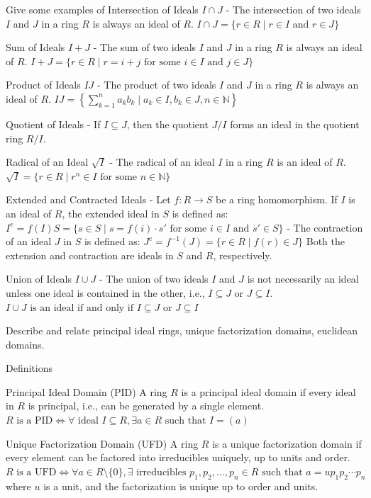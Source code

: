 Give some examples of 
Intersection of Ideals \(I \cap J\)
- The intersection of two ideals \(I\) and \(J\) in a ring \(R\) is always an ideal of \(R\).
\(
I \cap J = \{ r \in R \mid r \in I \text{ and } r \in J \}
\)

Sum of Ideals \(I + J\)
- The sum of two ideals \(I\) and \(J\) in a ring \(R\) is always an ideal of \(R\).
\(
I + J = \{ r \in R \mid r = i + j \text{ for some } i \in I \text{ and } j \in J \}
\)

Product of Ideals \(IJ\)
- The product of two ideals \(I\) and \(J\) in a ring \(R\) is always an ideal of \(R\).
\(
IJ = \left\{ \sum_{k=1}^n a_k b_k \mid a_k \in I, b_k \in J, n \in \mathbb{N} \right\}
\)

Quotient of Ideals
- If \(I \subseteq J\), then the quotient \(J/I\) forms an ideal in the quotient ring \(R/I\).

Radical of an Ideal \(\sqrt{I}\)
- The radical of an ideal \(I\) in a ring \(R\) is an ideal of \(R\).
\(
\sqrt{I} = \{ r \in R \mid r^n \in I \text{ for some } n \in \mathbb{N} \}
\)

Extended and Contracted Ideals
- Let \(f: R \to S\) be a ring homomorphism. If \(I\) is an ideal of \(R\), the extended ideal in \(S\) is defined as:
 \(
 I^e = f(I)S = \{ s \in S \mid s = f(i) \cdot s' \text{ for some } i \in I \text{ and } s' \in S \}
 \)
 - The contraction of an ideal \(J\) in \(S\) is defined as:
 \(
 J^c = f^{-1}(J) = \{ r \in R \mid f(r) \in J \}
 \)
 Both the extension and contraction are ideals in \(S\) and \(R\), respectively.

Union of Ideals \(I \cup J\)
- The union of two ideals \(I\) and \(J\) is not necessarily an ideal unless one ideal is contained in the other, i.e., \(I \subseteq J\) or \(J \subseteq I\).
\(
I \cup J \text{ is an ideal if and only if } I \subseteq J \text{ or } J \subseteq I
\)


Describe and relate principal ideal rings, unique factorization domains, euclidean domains.

Definitions

Principal Ideal Domain (PID)
A ring \( R \) is a principal ideal domain if every ideal in \( R \) is principal, i.e., can be generated by a single element.
\( 
R \text{ is a PID} \iff \forall \text{ ideal } I \subseteq R, \exists a \in R \text{ such that } I = (a)
\) 

Unique Factorization Domain (UFD)
A ring \( R \) is a unique factorization domain if every element can be factored into irreducibles uniquely, up to units and order.
\( 
R \text{ is a UFD} \iff \forall a \in R \setminus \{0\}, \exists \text{ irreducibles } p_1, p_2, \ldots, p_n \in R \text{ such that } a = u p_1 p_2 \cdots p_n
\) 
where \( u \) is a unit, and the factorization is unique up to order and units.

